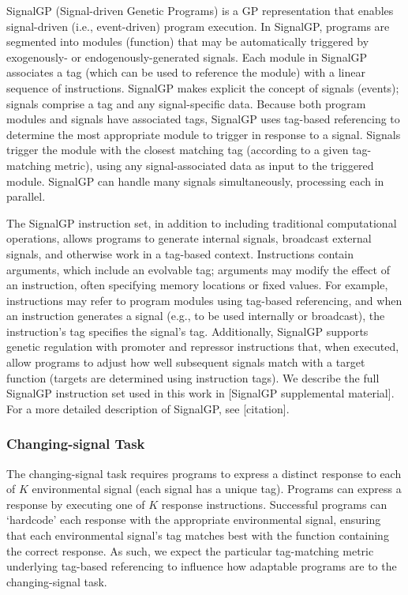 SignalGP (Signal-driven Genetic Programs) is a GP representation that enables signal-driven (i.e., event-driven)
program execution.
In SignalGP, programs are segmented into modules (function) that may be automatically triggered by
exogenously- or endogenously-generated signals.
Each module in SignalGP associates a tag (which can be used to reference the module) with a linear
sequence of instructions.
SignalGP makes explicit the concept of signals (events); signals comprise a tag and any signal-specific
data.
Because both program modules and signals have associated tags, SignalGP uses tag-based referencing to
determine the most appropriate module to trigger in response to a signal.
Signals trigger the module with the closest matching tag (according to a given tag-matching metric),
using any signal-associated data as input to the triggered module.
SignalGP can handle many signals simultaneously, processing each in parallel.

The SignalGP instruction set, in addition to including traditional computational operations, allows
programs to generate internal signals, broadcast external signals, and otherwise work in a tag-based context.
Instructions contain arguments, which include an evolvable tag; arguments may modify the effect of an
instruction, often specifying memory locations or fixed values.
For example, instructions may refer to program modules using tag-based referencing, and when an instruction
generates a signal (e.g., to be used internally or broadcast), the instruction's tag specifies the signal's
tag.
Additionally, SignalGP supports genetic regulation with promoter and repressor instructions
that, when executed, allow programs to adjust how well subsequent signals match with a target function
(targets are determined using instruction tags).
We describe the full SignalGP instruction set used in this work in [SignalGP supplemental material].
For a more detailed description of SignalGP, see [citation].

\subsubsection{Changing-signal Task}

The changing-signal task requires programs to express a distinct response
to each of $K$ environmental signal (each signal has a unique tag).
Programs can express a response by executing one of $K$ response instructions.
Successful programs can `hardcode' each response with the appropriate environmental signal, ensuring
that each environmental signal's tag matches best with the function containing the correct response.
As such, we expect the particular tag-matching metric underlying tag-based referencing to influence
how adaptable programs are to the changing-signal task.

